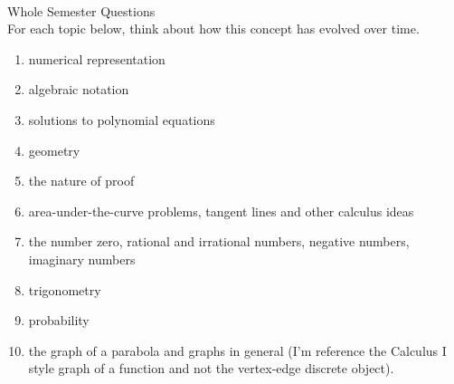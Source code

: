 \documentclass[11pt,fleqn]{article}
\begin{document}
\renewcommand{\headrulewidth}{0pt}
\newcommand{\blank}[1]{\rule{#1}{0.75pt}}
\newcommand{\bc}{\begin{center}}
\newcommand{\ec}{\end{center}}
\renewcommand{\d}{\displaystyle}

\vspace*{-0.7in}

\begin{center}
  \large
  \\
\end{center}

Whole Semester Questions\\
For each topic below, think about how this concept has evolved over time.
\begin{enumerate}
\item numerical representation
\item algebraic notation
\item solutions to polynomial equations
\item geometry
\item the nature of proof
\item area-under-the-curve problems, tangent lines and other calculus ideas
\item the number zero, rational and irrational numbers, negative numbers, imaginary numbers
\item trigonometry
\item probability
\item the graph of a parabola and graphs in general (I'm reference the Calculus I style graph of a function and not the vertex-edge discrete object).
\end{enumerate}
\end{document}
